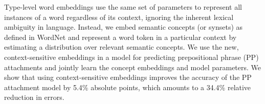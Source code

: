 Type-level word embeddings use the same set of parameters to represent all instances of a word regardless of its context, ignoring the inherent lexical ambiguity in language. Instead, we embed semantic concepts (or synsets) as defined in WordNet and represent a word token in a particular context by estimating a distribution over relevant semantic concepts. We use the new, context-sensitive embeddings in a model for predicting prepositional phrase (PP) attachments and jointly learn the concept embeddings and model parameters. We show that using context-sensitive embeddings improves the accuracy of the PP attachment model by 5.4\% absolute points, which amounts to a 34.4\% relative reduction in errors.
